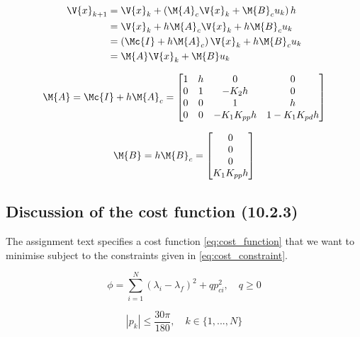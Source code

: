\begin{equation}\label{eq:disc}
\begin{aligned}
	\V{x}_{k+1} &= \V{x}_{k} + \left( \M{A}_{c} \V{x}_{k} + \M{B}_c u_{k} \right) h \\
				&= \V{x}_{k} + h\M{A}_{c}\V{x}_{k} + h\M{B}_{c}u_{k} \\
				&= \left( \Mc{I} + h\M{A}_{c} \right) \V{x}_{k} + h\M{B}_{c}u_{k} \\
				&= \M{A}\V{x}_{k} + \M{B}u_{k}
\end{aligned}
\end{equation}

\begin{equation}\label{eq:disc_matrix_A}
	\M{A} = \Mc{I} + h\M{A}_{c} =
	\begin{bmatrix}
		1 & h & 0 & 0 \\
		0 & 1 & -K_{2}h & 0 \\
		0 & 0 & 1 & h \\
		0 & 0 & -K_{1}K_{pp}h	& 1-K_{1}K_{pd}h
	\end{bmatrix}
\end{equation}

\begin{equation}\label{eq:disc_matrix_B}
	\M{B} = h\M{B}_c =
	\begin{bmatrix} 0 \\ 0 \\ 0 \\ K_{1}K_{pp}h \end{bmatrix}
\end{equation}


\subsection{Discussion of the cost function (10.2.3)}
The assignment text specifies a cost function \eqref{eq:cost_function} \cite{_helicopter_2015} that we want to minimise subject to the constraints given in \eqref{eq:cost_constraint}.


\begin{equation} \label {eq:cost_function}
	\phi = \sum\limits_{i=1}^N (\lambda_i - \lambda_f)^2 + q p_{ci}^2, \quad q \geq 0 
\end{equation}

\begin{equation} \label{eq:cost_constraint}
	|p_k| \leq \frac{30 \pi}{180}, \quad k \in \{ 1, ..., N \}
\end{equation}

